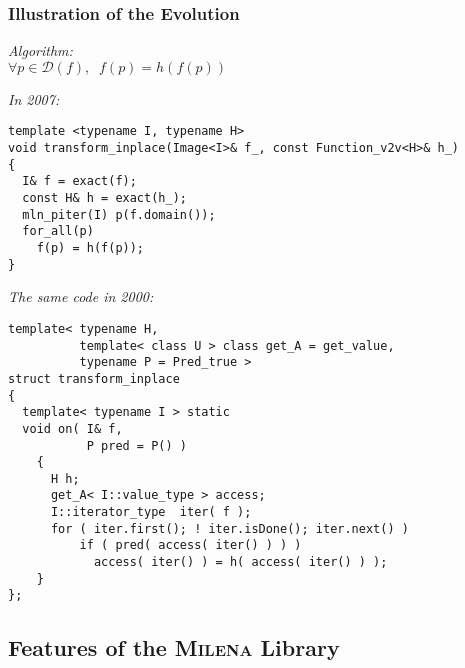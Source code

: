 \documentclass{beamer}
\newcommand{\mln}{\textsc{Milena}\xspace}
\begin{document}
\begin{frame}[fragile]
  \frametitle{Illustration of the Evolution}


\begin{minipage}{0.5\linewidth}
{\it Algorithm:}\\
\smallskip
{\tiny
$\forall p \in \mathcal{D}(f), \;\; f(p) = \mathit{h}(f(p))$
}

\bigskip\medskip

{\it In 2007:}
\smallskip
\begin{lstlisting}[basicstyle={\tiny\sffamily}]
template <typename I, typename H>
void transform_inplace(Image<I>& f_, const Function_v2v<H>& h_)
{
  I& f = exact(f);
  const H& h = exact(h_);
  mln_piter(I) p(f.domain());
  for_all(p)
    f(p) = h(f(p));
}

\end{lstlisting}

\end{minipage}
  \hspace*{2mm}
\begin{minipage}{.45\linewidth}

{\it The same code in 2000:}
\smallskip
\begin{lstlisting}[basicstyle={\tiny\sffamily}]
template< typename H,
          template< class U > class get_A = get_value,
          typename P = Pred_true >
struct transform_inplace
{
  template< typename I > static
  void on( I& f,
           P pred = P() )
    {
      H h;
      get_A< I::value_type > access;
      I::iterator_type  iter( f );
      for ( iter.first(); ! iter.isDone(); iter.next() )
          if ( pred( access( iter() ) ) )
            access( iter() ) = h( access( iter() ) );
    }
};
\end{lstlisting}
  
\end{minipage}

\end{frame}



\subsection{Features of the \mln Library}
\end{document}

